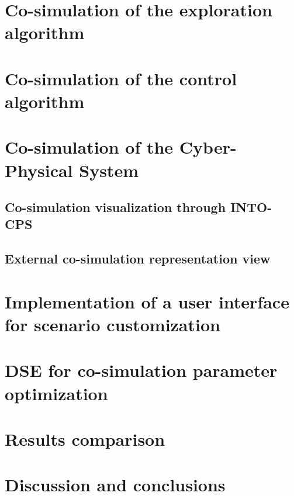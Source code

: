 \documentclass[english]{article}
\begin{document}
\section{Co-simulation of the exploration algorithm}
\label{Implementation of the exploration algorithm}

\section{Co-simulation of the control algorithm}
\label{Co-simulation of the control algorithm}

\section{Co-simulation of the Cyber-Physical System}
\label{Co-simulation of the Cyber-Physical System}

\subsection{Co-simulation visualization through INTO-CPS}
\label{Co-simulation visualization through INTO-CPS}

\subsection{External co-simulation representation view}
\label{External co-simulation representation view}

\section{Implementation of a user interface for scenario customization}
\label{Implementation of a user interface for scenario customization}

\section{DSE for co-simulation parameter optimization}
\label{DSE for co-simulation parameter optimization}

\section{Results comparison}
\label{Results comparison}

\section{Discussion and conclusions}
\label{Discussion and conclusions}

\clearpage\null\thispagestyle{empty}\newpage

\let\Section\section 
\def\section*#1{\Section{#1}}



\clearpage
\end{document}

